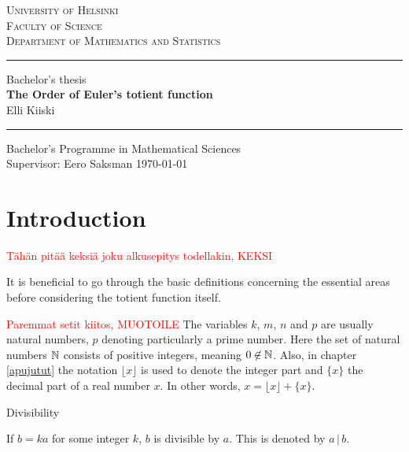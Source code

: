\documentclass{article}
\begin{document}
\begin{titlepage}
\setlength{\parindent}{0mm}
\Large
\textsc{University of Helsinki \\
Faculty of Science\\
Department of Mathematics and Statistics}
\vspace{5mm}
\hrule height2pt

\begin{center}
\vfill
\Large Bachelor's thesis  \\
\vspace{3mm}
\huge 
\textbf{The Order of Euler's totient function}\\
\vspace{3mm}
\Large Elli Kiiski
\vfill
\end{center}

\hrule height2pt
\vspace{5mm}
Bachelor's Programme in Mathematical Sciences \\[2mm]
Supervisor: Eero Saksman
\hfill
\today
\end{titlepage}

\tableofcontents
\thispagestyle{empty}
\clearpage

\section{Introduction}

\textcolor{red}{Tähän pitää keksiä joku alkusepitys todellakin, KEKSI}

It is beneficial to go through the basic definitions concerning the essential areas before considering the totient function itself.

\textcolor{red}{Paremmat setit kiitos, MUOTOILE} The variables $k$, $m$, $n$ and $p$ are usually natural numbers, $p$ denoting particularly a prime number. Here the set of natural numbers $\mathbb{N}$ consists of positive integers, meaning $0 \not\in \mathbb{N}$. Also, in chapter \ref{apujutut} the notation $\lfloor x\rfloor$ is used to denote the integer part and $\{x\}$ the decimal part of a real number $x$. In other words, $x=\lfloor x\rfloor+\{x\}$.

\begin{definition}
Divisibility

If $b=ka$ for some integer $k$, $b$ is divisible by $a$. This is denoted by $a \,\vert\, b$.

\end{definition}
\end{document}
